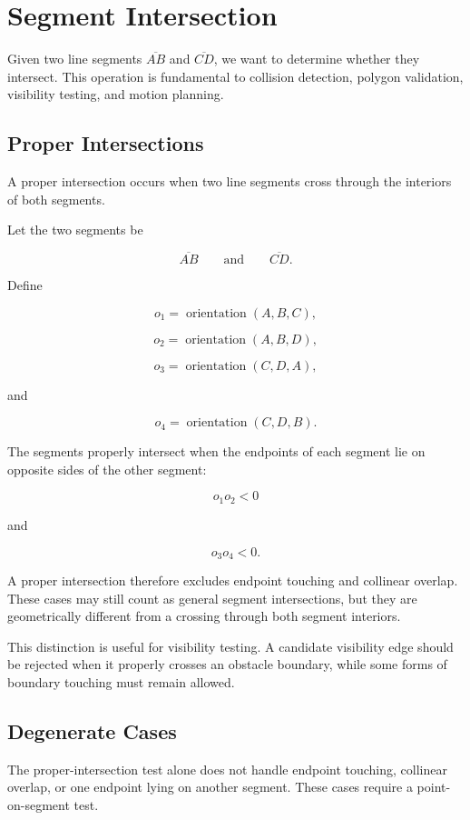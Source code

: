 \section{Segment Intersection}

Given two line segments $\overline{AB}$ and $\overline{CD}$, we want to
determine whether they intersect. This operation is fundamental to collision
detection, polygon validation, visibility testing, and motion planning.

\subsection{Proper Intersections}

A proper intersection occurs when two line segments cross through the
interiors of both segments.

Let the two segments be

\[
\overline{AB}
\qquad\text{and}\qquad
\overline{CD}.
\]

Define

\[
o_1 = \operatorname{orientation}(A,B,C),
\]

\[
o_2 = \operatorname{orientation}(A,B,D),
\]

\[
o_3 = \operatorname{orientation}(C,D,A),
\]

and

\[
o_4 = \operatorname{orientation}(C,D,B).
\]

The segments properly intersect when the endpoints of each segment lie on
opposite sides of the other segment:

\[
o_1 o_2 < 0
\]

and

\[
o_3 o_4 < 0.
\]

A proper intersection therefore excludes endpoint touching and collinear
overlap. These cases may still count as general segment intersections, but
they are geometrically different from a crossing through both segment
interiors.

This distinction is useful for visibility testing. A candidate visibility
edge should be rejected when it properly crosses an obstacle boundary, while
some forms of boundary touching must remain allowed.

\subsection{Degenerate Cases}

The proper-intersection test alone does not handle endpoint touching,
collinear overlap, or one endpoint lying on another segment. These cases
require a point-on-segment test.

